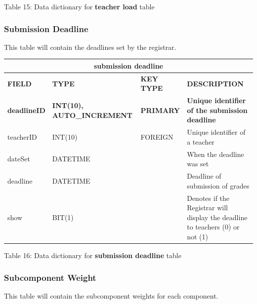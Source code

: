 \documentclass[11pt,a4paper,titlepage]{article}
\begin{document}
\vspace{.5cm}
\begin{center}
    Table 15: Data dictionary for \textbf{teacher load} table
\end{center}


\subsubsection{Submission Deadline}

This table will contain the deadlines set by the registrar.

\vspace{1cm}
\begin{longtable}{ |p{2.5cm}|p{4.5cm}|p{2.5cm}|p{3cm}|  }
    \hline
    \multicolumn{4}{|c|}{\textbf{submission deadline}} \\
    \hline
    \textbf{FIELD}&\textbf{TYPE}&\textbf{KEY TYPE}&\textbf{DESCRIPTION}\\
    \hline
    \textbf{deadlineID}  & \textbf{INT(10), AUTO\_INCREMENT} & \textbf{PRIMARY} & \textbf{Unique identifier of the submission deadline}\\ \hline
    teacherID   & INT(10) & FOREIGN & Unique identifier of a teacher\\ \hline
    dateSet   & DATETIME &  & When the deadline was set\\ \hline
    deadline   & DATETIME &  & Deadline of submission of grades\\ \hline
    show   & BIT(1) &  & Denotes if the Registrar will display the deadline to teachers (0) or not (1)\\ \hline
\end{longtable}

\vspace{.5cm}
\begin{center}
    Table 16: Data dictionary for \textbf{submission deadline} table
\end{center}


\subsubsection{Subcomponent Weight}

This table will contain the subcomponent weights for each component.
\end{document}
